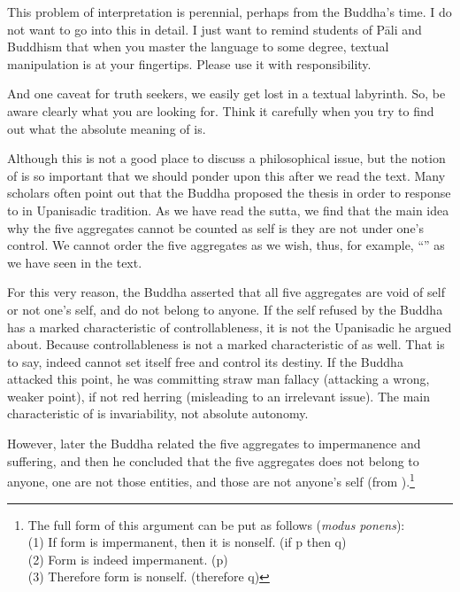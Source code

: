 This problem of interpretation is perennial, perhaps from the Buddha's time. I do not want to go into this in detail. I just want to remind students of P\=ali and Buddhism that when you master the language to some degree, textual manipulation is at your fingertips. Please use it with responsibility. 

And one caveat for truth seekers, we easily get lost in a textual labyrinth. So, be aware clearly what you are looking for. Think it carefully when you try to find out what the absolute meaning of  is.

Although this is not a good place to discuss a philosophical issue, but the notion of  is so important that we should ponder upon this after we read the text. Many scholars often point out that the Buddha proposed the  thesis in order to response to  in Upanisadic tradition. As we have read the sutta, we find that the main idea why the five aggregates cannot be counted as self is they are not under one's control. We cannot order the five aggregates as we wish, thus, for example, ``'' as we have seen in the text. 

For this very reason, the Buddha asserted that all five aggregates are void of self or not one's self, and do not belong to anyone. If the self refused by the Buddha has a marked characteristic of controllableness, it is not the Upanisadic  he argued about. Because controllableness is not a marked characteristic of  as well. That is to say,  indeed cannot set itself free and control its destiny. If the Buddha attacked this point, he was committing straw man fallacy (attacking a wrong, weaker point), if not red herring (misleading to an irrelevant issue). The main characteristic of  is invariability, not absolute autonomy.

However, later the Buddha related the five aggregates to impermanence and suffering, and then he concluded that the five aggregates does not belong to anyone, one are not those entities, and those are not anyone's self (from ).\footnote{The full form of this argument can be put as follows (\textit{modus ponens}):\\(1) If form is impermanent, then it is nonself. (if p then q)\\(2) Form is indeed impermanent. (p)\\(3) Therefore form is nonself. (therefore q)}

